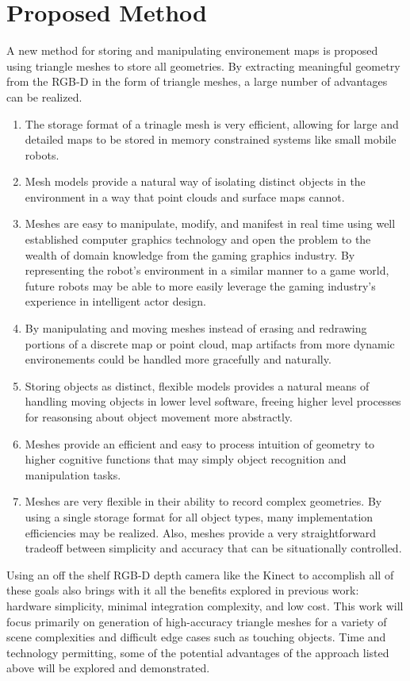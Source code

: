 \documentclass[letterpaper, 10 pt, conference]{ieeeconf}
\begin{document}
\section*{Proposed Method}
A new method for storing and manipulating environement maps is proposed using triangle meshes to store all geometries. By extracting meaningful geometry from the RGB-D in the form of triangle meshes, a large number of advantages can be realized.
\begin{enumerate}
\item The storage format of a trinagle mesh is very efficient, allowing for large and detailed maps to be stored in memory constrained systems like small mobile robots. 
\item Mesh models provide a natural way of isolating distinct objects in the environment in a way that point clouds and surface maps cannot. 
\item Meshes are easy to manipulate, modify, and manifest in real time using well established computer graphics technology and open the problem to the wealth of domain knowledge from the gaming graphics industry. By representing the robot's environment in a similar manner to a game world, future robots may be able to more easily leverage the gaming industry's experience in intelligent actor design. 
\item By manipulating and moving meshes instead of erasing and redrawing portions of a discrete map or point cloud, map artifacts from more dynamic environements could be handled more gracefully and naturally.
\item Storing objects as distinct, flexible models provides a natural means of handling moving objects in lower level software, freeing higher level processes for reasonsing about object movement more abstractly.
\item Meshes provide an efficient and easy to process intuition of geometry to higher cognitive functions that may simply object recognition and manipulation tasks.
\item Meshes are very flexible in their ability to record complex geometries. By using a single storage format for all object types, many implementation efficiencies may be realized. Also, meshes provide a very straightforward tradeoff between simplicity and accuracy that can be situationally controlled.
\end{enumerate}
Using an off the shelf RGB-D depth camera like the Kinect to accomplish all of these goals also brings with it all the benefits explored in previous work: hardware simplicity, minimal integration complexity, and low cost. This work will focus primarily on generation of high-accuracy triangle meshes for a variety of scene complexities and difficult edge cases such as touching objects. Time and technology permitting, some of the potential advantages of the approach listed above will be explored and demonstrated.
\end{document}
